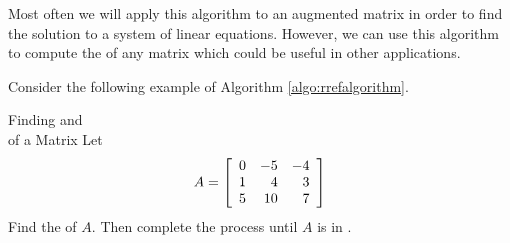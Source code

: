 Most often we will apply this algorithm to an augmented matrix in order to find the solution
to a system of linear equations. However, we can use this algorithm to compute the \rref \;of any matrix which could be useful in other applications.

Consider the following example of Algorithm \ref{algo:rrefalgorithm}.

\begin{example}{Finding \EF and \\ \RREF of a Matrix}\label{exa:findingechelonandrref}
Let
\begin{equation*}
A = \left[
\begin{array}{rrr}
0 & -5 & -4 \\
1 & 4 & 3 \\
5 & 10 & 7
\end{array}
\right]
\end{equation*}
Find the \ef \;of $A$. Then complete
the process until $A$ is in \rref.
\end{example}

